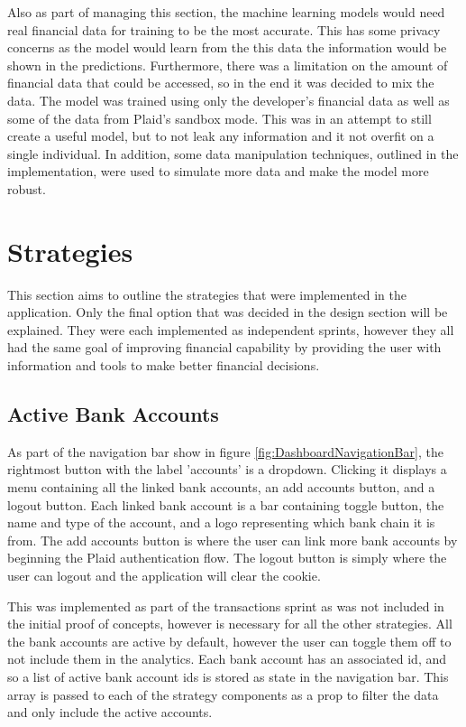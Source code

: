 Also as part of managing this section, the machine learning models would need real financial data for training to be the most accurate. This has some privacy concerns as the model would learn from the this data the information would be shown in the predictions. Furthermore, there was a limitation on the amount of financial data that could be accessed, so in the end it was decided to mix the data. The model was trained using only the developer's financial data as well as some of the data from Plaid's sandbox mode. This was in an attempt to still create a useful model, but to not leak any information and it not overfit on a single individual. In addition, some data manipulation techniques, outlined in the implementation, were used to simulate more data and make the model more robust.

\section{Strategies}
This section aims to outline the strategies that were implemented in the application. Only the final option that was decided in the design section will be explained. They were each implemented as independent sprints, however they all had the same goal of improving financial capability by providing the user with information and tools to make better financial decisions.

\subsection{Active Bank Accounts}
As part of the navigation bar show in figure \ref{fig:DashboardNavigationBar}, the rightmost button with the label 'accounts' is a dropdown. Clicking it displays a menu containing all the linked bank accounts, an add accounts button, and a logout button. Each linked bank account is a bar containing toggle button, the name and type of the account, and a logo representing which bank chain it is from. The add accounts button is where the user can link more bank accounts by beginning the Plaid authentication flow. The logout button is simply where the user can logout and the application will clear the cookie.

This was implemented as part of the transactions sprint as was not included in the initial proof of concepts, however is necessary for all the other strategies. All the bank accounts are active by default, however the user can toggle them off to not include them in the analytics. Each bank account has an associated id, and so a list of active bank account ids is stored as state in the navigation bar. This array is passed to each of the strategy components as a prop to filter the data and only include the active accounts.

